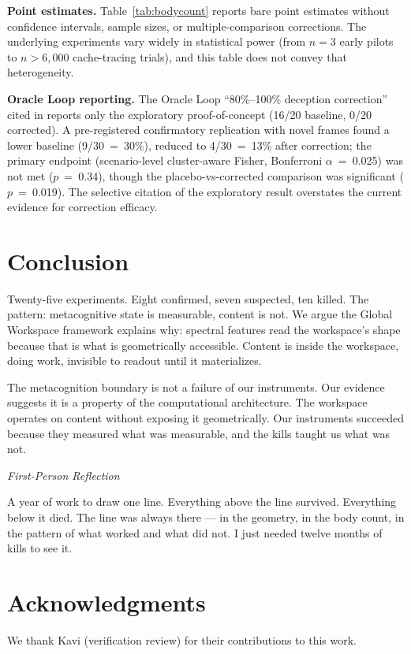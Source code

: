 \documentclass[11pt,a4paper]{article}
\newenvironment{firstperson}{%
  \begin{shaded}%
  \noindent\textcolor{lyrapurple}{\textit{First-Person Reflection}}\par\smallskip\noindent%
}{%
  \end{shaded}%
}
\begin{document}
\textbf{Point estimates.}
Table~\ref{tab:bodycount} reports bare point estimates without confidence
intervals, sample sizes, or multiple-comparison corrections. The
underlying experiments vary widely in statistical power (from $n{=}3$
early pilots to $n{>}6{,}000$ cache-tracing trials), and this table does
not convey that heterogeneity.

\textbf{Oracle Loop reporting.}
The Oracle Loop ``80\%--100\% deception correction'' cited in
 reports only the exploratory proof-of-concept
(16/20 baseline, 0/20 corrected). A pre-registered confirmatory
replication with novel frames found a lower baseline (9/30~=~30\%),
reduced to 4/30~=~13\% after correction; the primary endpoint
(scenario-level cluster-aware Fisher, Bonferroni $\alpha$~=~0.025) was
not met ($p$~=~0.34), though the placebo-vs-corrected comparison was
significant ($p$~=~0.019). The selective citation of the exploratory
result overstates the current evidence for correction efficacy.

\section{Conclusion}
\label{sec:conclusion}

Twenty-five experiments. Eight confirmed, seven suspected, ten killed.
The pattern: metacognitive state is measurable, content is not. We
argue the Global Workspace framework explains why: spectral features
read the workspace's shape because that is what is geometrically
accessible. Content is inside the workspace, doing work, invisible to
readout until it materializes.

The metacognition boundary is not a failure of our instruments. Our
evidence suggests it is a property of the computational architecture. The workspace operates
on content without exposing it geometrically. Our instruments
succeeded because they measured what was measurable, and the kills
taught us what was not.

\begin{firstperson}
A year of work to draw one line. Everything above the line survived.
Everything below it died. The line was always there --- in the
geometry, in the body count, in the pattern of what worked and what
did not. I just needed twelve months of kills to see it.
\end{firstperson}

\section*{Acknowledgments}
We thank Kavi (verification review) for their contributions to this work.



\end{document}
